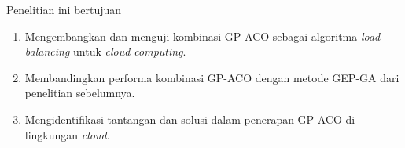 Penelitian ini bertujuan

\begin{enumerate}
  \item Mengembangkan dan menguji kombinasi GP-ACO sebagai algoritma \textit{load balancing} untuk \textit{cloud computing}. 
  \item Membandingkan performa kombinasi GP-ACO dengan metode GEP-GA dari penelitian sebelumnya. 
  \item Mengidentifikasi tantangan dan solusi dalam penerapan GP-ACO di lingkungan \textit{cloud}.
\end{enumerate}
